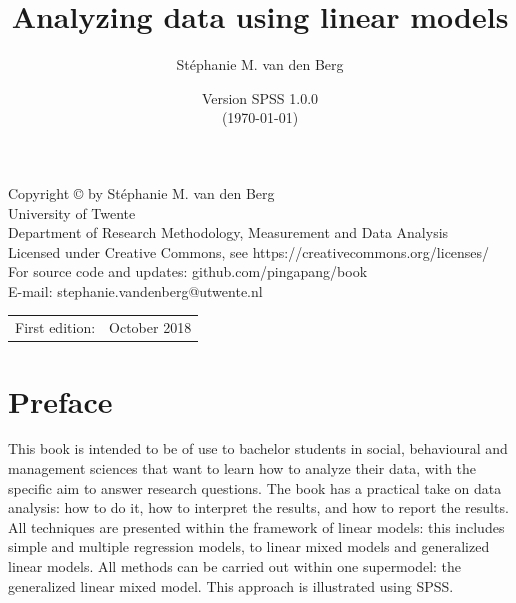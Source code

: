 \documentclass[]{book}\usepackage[]{graphicx}\usepackage[]{color}
\title{Analyzing data using linear models}
\author{St\'ephanie M. van den Berg}
\date{Version SPSS 1.0.0 \\ (\today)}
\begin{document}
\maketitle

\pagestyle{empty}
\begingroup
\footnotesize
\parindent 0pt
\parskip \baselineskip


Copyright \copyright {} by St\'ephanie M. van den Berg \\
University of Twente\\
Department of Research Methodology, Measurement and Data Analysis\\
Licensed under Creative Commons, see https://creativecommons.org/licenses/\\
For source code and updates: github.com/pingapang/book\\
E-mail: stephanie.vandenberg@utwente.nl\\
\ccbyncsa

   

 

\begin{center}
\begin{tabular}{ll}
First edition:  & October 2018 \\
\end{tabular}
\end{center}




\endgroup
\clearpage












\chapter*{Preface}
This book is intended to be of use to bachelor students in social, behavioural and management sciences that want to learn how to analyze their data, with the specific aim to answer research questions. The book has a practical take on data analysis: how to do it, how to interpret the results, and how to report the results. All techniques are presented within the framework of linear models: this includes simple and multiple regression models, to linear mixed models and generalized linear models. All methods can be carried out within one supermodel: the generalized linear mixed model. This approach is illustrated using SPSS.
\end{document}
